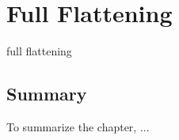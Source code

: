 \chapter{Full Flattening}
\label{chapter:fullflattening}
full flattening

\section*{Summary}
To summarize the chapter, ...